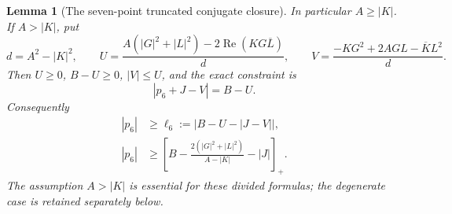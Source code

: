 \documentclass[11pt]{article}
\newtheorem{lemma}[theorem]{Lemma}
\theoremstyle{remark}
\numberwithin{equation}{section}
\begin{document}
\begin{lemma}[The seven-point truncated conjugate closure]
In particular $A\ge|K|$. If $A>|K|$, put
\[
 d=A^2-|K|^2,\qquad
 U=\frac{A(|G|^2+|L|^2)-2\operatorname{Re}(KG\overline L)}d,
 \qquad
 V=\frac{-KG^2+2AGL-\overline K L^2}d.
\]
Then $U\ge0$, $B-U\ge0$, $|V|\le U$, and the exact constraint is
\begin{equation}\label{eq:noorigin-oct7-sixth-circle}
                  |p_6+J-V|=B-U.
\end{equation}
Consequently
\begin{align}
 |p_6|&\ge\ell_6:=\bigl|B-U-|J-V|\bigr|,
                    \label{eq:noorigin-oct7-sixth-lower}\\
 |p_6|&\ge\left[B-\frac{2(|G|^2+|L|^2)}{A-|K|}-|J|\right]_+.
                    \label{eq:noorigin-oct7-sixth-simple}
\end{align}
The assumption $A>|K|$ is essential for these divided formulas;
the degenerate case is retained separately below.
\end{lemma}
\end{document}
